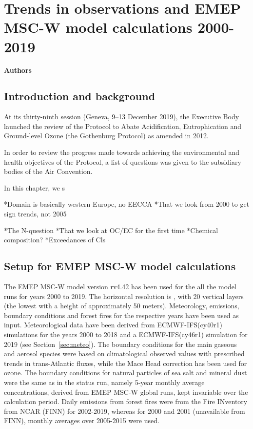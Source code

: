 \chapter[Trends]{Trends in observations and EMEP MSC-W model calculations 2000-2019}
\label{ch:Trends}

{\bf{Authors}}\\


\section{\label{sec:Trends_introduction}Introduction and background}
At its thirty-ninth session (Geneva, 9–13 December 2019), the Executive Body launched the review of the Protocol to Abate Acidification, Eutrophication and Ground-level Ozone (the Gothenburg Protocol) as amended in 2012.

In order to review the progress made towards achieving the environmental and health objectives of the Protocol, a
list of questions was given to the subsidiary bodies of the Air Convention.

In this chapter, we s

*Domain is basically western Europe, no EECCA
*That we look from 2000 to get sign trends, not 2005

*The N-question
*That we look at OC/EC for the first time
*Chemical composition?
*Exceedances of Cls

\section{\label{EMEPmodelcalc}{Setup for EMEP MSC-W model calculations}}
The EMEP MSC-W model version rv4.42 has been used for the all the model runs for years 2000 to 2019. The horizontal resolution is \resZO, with 20 vertical layers (the lowest with a height of approximately 50 meters).
 Meteorology, emissions, boundary conditions and forest fires for the respective years have been used as input. Meteorological data have been
 derived from ECMWF-IFS(cy40r1) simulations for the years 2000 to 2018 and a ECMWF-IFS(cy46r1) simulation for 2019 (see Section~\ref{sec:meteo}). 
 The boundary conditions for the main gaseous and aerosol species were based on climatological observed values with prescribed trends in trans-Atlantic fluxes, while the Mace
Head correction has been used for ozone. The boundary conditions for natural particles of
sea salt and mineral dust were the same as in the status run, namely 5-year monthly average
concentrations, derived from EMEP MSC-W global runs, kept invariable over the calculation
period.
Daily emissions from forest fires were from the Fire INventory from NCAR (FINN) for 2002-2019,
whereas for 2000 and 2001 (unavailable from FINN), monthly averages over 2005-2015 were
used.

